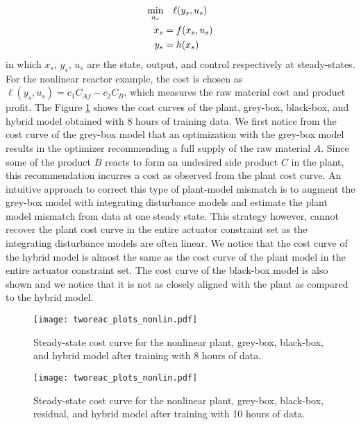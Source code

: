 \documentclass{article}
\begin{document}
\begin{align*}
  \underset{u_s}{\textnormal{min}} & \quad \ell(y_s, u_s) \\
  x_s &= f(x_s, u_s)\\ 
  y_s &= h(x_s)
\end{align*}
in which $x_s$, $y_s$, $u_s$ are the state, output, and control respectively at
steady-states. For the nonlinear reactor example, the cost is chosen as
$\ell(y_s, u_s) = c_1C_{Af} - c_2C_B$, which measures the raw material cost and
product profit. The Figure \ref{fig:cost_curves} shows the cost curves of the
plant, grey-box, black-box, and hybrid model obtained with 8 hours of training
data. We first notice from the cost curve of the grey-box model that an
optimization with the grey-box model results in the optimizer recommending a
full supply of the raw material $A$. Since some of the product $B$ reacts to
form an undesired side product $C$ in the plant, this recommendation incurres a
cost as observed from the plant cost curve. An intuitive approach to correct
this type of plant-model mismatch is to augment the grey-box model with
integrating disturbance models and estimate the plant model mismatch from data
at one steady state. This strategy however, cannot recover the plant cost curve
in the entire actuator constraint set as the integrating disturbance models are
often linear. We notice that the cost curve of the hybrid model is almost the
same as the cost curve of the plant model in the entire actuator constraint set.
The cost curve of the black-box model is also shown and we notice that it is not
as closely aligned with the plant as compared to the hybrid model.

\begin{figure}[!h]
  \centering
  \texttt{[image: tworeac\_plots\_nonlin.pdf]}
  \caption{Steady-state cost curve for the nonlinear plant, grey-box, black-box,
  and hybrid model after training with 8 hours of data.}
  \label{fig:cost_curves}
\end{figure}

\begin{figure}[!h]
  \centering
  \texttt{[image: tworeac\_plots\_nonlin.pdf]}
  \caption{Steady-state cost curve for the nonlinear plant, grey-box, black-box,
  residual, and hybrid model after training with 10 hours of data.}
  \label{fig:cost_error_bb}
\end{figure}
\end{document}

